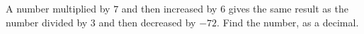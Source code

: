 A number multiplied by $7$ and then increased by $6$ gives the same result as the number divided by $3$ and then decreased by $-72$. Find the number, as a decimal.
